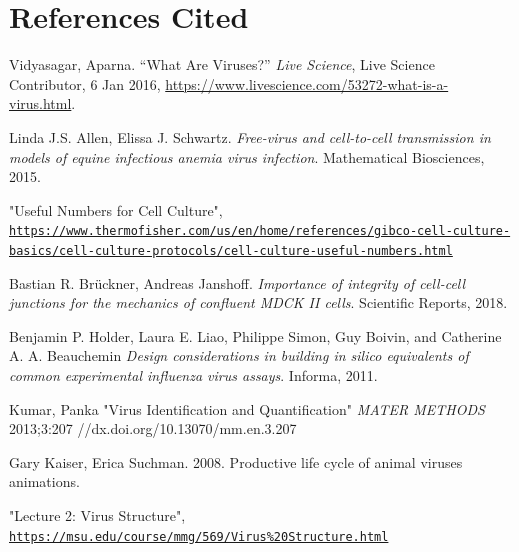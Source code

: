 \documentclass[a4paper]{article}
\begin{document}
\clearpage

\section{References Cited}



\begin{thebibliography}{9}

Vidyasagar, Aparna. 
“What Are Viruses?”
\textit{Live Science}, 
Live Science Contributor, 6 Jan 2016, 
\url{https://www.livescience.com/53272-what-is-a-virus.html}.

Linda J.S. Allen, Elissa J. Schwartz. 
\textit{Free-virus and cell-to-cell transmission in models of equine infectious
anemia virus infection}. 
Mathematical Biosciences, 2015.

"Useful Numbers for Cell Culture",
\\
\texttt{\url{https://www.thermofisher.com/us/en/home/references/gibco-cell-culture-basics/cell-culture-protocols/cell-culture-useful-numbers.html}}

Bastian R. Br{\"u}ckner, Andreas Janshoff.
\textit{Importance of integrity of cell-cell junctions for the mechanics of confluent MDCK II cells}. 
Scientific Reports, 2018.

Benjamin P. Holder, Laura E. Liao, Philippe Simon, Guy Boivin, and Catherine A. A. Beauchemin
\textit{Design considerations in building in silico equivalents of common
experimental influenza virus assays}. 
Informa, 2011.

Kumar, Panka
"Virus Identification and Quantification"
\textit{MATER METHODS} 2013;3:207
//dx.doi.org/10.13070/mm.en.3.207

Gary Kaiser, Erica Suchman. 
2008. 
Productive life cycle of animal viruses animations. 

"Lecture 2: Virus Structure",
\\
\texttt{\url{https://msu.edu/course/mmg/569/Virus\%20Structure.html}}


\end{thebibliography}
\end{document}
